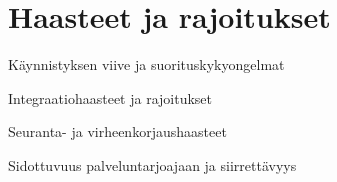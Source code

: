 \chapter{Haasteet ja rajoitukset} \label{Haasteet}

Käynnistyksen viive ja suorituskykyongelmat

Integraatiohaasteet ja rajoitukset

Seuranta- ja virheenkorjaushaasteet

Sidottuvuus palveluntarjoajaan ja siirrettävyys

